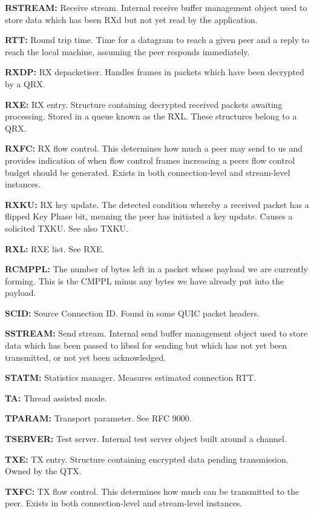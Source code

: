 {\bfseries{RSTREAM\+:}} Receive stream. Internal receive buffer management object used to store data which has been RX\textquotesingle{}d but not yet read by the application.

{\bfseries{RTT\+:}} Round trip time. Time for a datagram to reach a given peer and a reply to reach the local machine, assuming the peer responds immediately.

{\bfseries{RXDP\+:}} RX depacketiser. Handles frames in packets which have been decrypted by a QRX.

{\bfseries{RXE\+:}} RX entry. Structure containing decrypted received packets awaiting processing. Stored in a queue known as the RXL. These structures belong to a QRX.

{\bfseries{RXFC\+:}} RX flow control. This determines how much a peer may send to us and provides indication of when flow control frames increasing a peer\textquotesingle{}s flow control budget should be generated. Exists in both connection-\/level and stream-\/level instances.

{\bfseries{RXKU\+:}} RX key update. The detected condition whereby a received packet has a flipped Key Phase bit, meaning the peer has initiated a key update. Causes a solicited TXKU. See also TXKU.

{\bfseries{RXL\+:}} RXE list. See RXE.

{\bfseries{RCMPPL\+:}} The number of bytes left in a packet whose payload we are currently forming. This is the CMPPL minus any bytes we have already put into the payload.

{\bfseries{SCID\+:}} Source Connection ID. Found in some QUIC packet headers.

{\bfseries{SSTREAM\+:}} Send stream. Internal send buffer management object used to store data which has been passed to libssl for sending but which has not yet been transmitted, or not yet been acknowledged.

{\bfseries{STATM\+:}} Statistics manager. Measures estimated connection RTT.

{\bfseries{TA\+:}} Thread assisted mode.

{\bfseries{TPARAM\+:}} Transport parameter. See RFC 9000.

{\bfseries{TSERVER\+:}} Test server. Internal test server object built around a channel.

{\bfseries{TXE\+:}} TX entry. Structure containing encrypted data pending transmission. Owned by the QTX.

{\bfseries{TXFC\+:}} TX flow control. This determines how much can be transmitted to the peer. Exists in both connection-\/level and stream-\/level instances.

